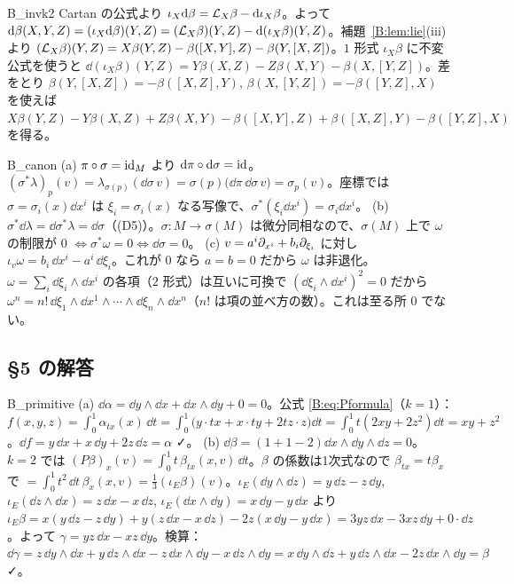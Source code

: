 \begin{soll}{B_invk2}
Cartan の公式より $\iota_X\mathrm{d}\beta=\mathcal L_X\beta-\mathrm{d}\iota_X\beta$。よって $\mathrm{d}\beta(X,Y,Z)=(\iota_X\mathrm{d}\beta)(Y,Z)=(\mathcal L_X\beta)(Y,Z)-\mathrm{d}(\iota_X\beta)(Y,Z)$。補題~\ref{B:lem:lie}(iii) より $(\mathcal L_X\beta)(Y,Z)=X\beta(Y,Z)-\beta([X,Y],Z)-\beta(Y,[X,Z])$。$1$ 形式 $\iota_X\beta$ に不変公式を使うと $\dd(\iota_X\beta)(Y,Z)=Y\beta(X,Z)-Z\beta(X,Y)-\beta(X,[Y,Z])$。差をとり $\beta(Y,[X,Z])=-\beta([X,Z],Y)$, $\beta(X,[Y,Z])=-\beta([Y,Z],X)$ を使えば
$X\beta(Y,Z)-Y\beta(X,Z)+Z\beta(X,Y)-\beta([X,Y],Z)+\beta([X,Z],Y)-\beta([Y,Z],X)$ を得る。
\end{soll}

\begin{soll}{B_canon}
(a) $\pi\circ\sigma=\mathrm{id}_M$ より $\mathrm{d}\pi\circ\mathrm{d}\sigma=\mathrm{id}$。$(\sigma^*\lambda)_p(v)=\lambda_{\sigma(p)}(\dd\sigma\,v)=\sigma(p)\bigl(\dd\pi\,\dd\sigma\,v\bigr)=\sigma_p(v)$。座標では $\sigma=\sigma_i(x)\dd x^i$ は $\xi_i=\sigma_i(x)$ なる写像で、$\sigma^*(\xi_i\dd x^i)=\sigma_i\dd x^i$。
(b) $\sigma^*\dd\lambda=\dd\sigma^*\lambda=\dd\sigma$（(D5)）。$\sigma:M\to\sigma(M)$ は微分同相なので、$\sigma(M)$ 上で $\omega$ の制限が $0$ $\iff\sigma^*\omega=0\iff\dd\sigma=0$。
(c) $v=a^i\partial_{x^i}+b_i\partial_{\xi_i}$ に対し $\iota_v\omega=b_i\,\dd x^i-a^i\,\dd\xi_i$。これが $0$ なら $a=b=0$ だから $\omega$ は非退化。$\omega=\sum_i\dd\xi_i\wedge\dd x^i$ の各項（$2$ 形式）は互いに可換で $(\dd\xi_i\wedge\dd x^i)^2=0$ だから $\omega^n=n!\,\dd\xi_1\wedge\dd x^1\wedge\cdots\wedge\dd\xi_n\wedge\dd x^n$（$n!$ は項の並べ方の数）。これは至る所 $0$ でない。
\end{soll}

\subsection*{§5 の解答}
\begin{soll}{B_primitive}
(a) $\dd\alpha=\dd y\wedge\dd x+\dd x\wedge\dd y+0=0$。公式 \eqref{B:eq:Pformula}（$k=1$）：$f(x,y,z)=\int_0^1\alpha_{tx}(x)\,\dd t=\int_0^1\bigl(y\cdot tx+x\cdot ty+2tz\cdot z\bigr)\dd t=\int_0^1t(2xy+2z^2)\dd t=xy+z^2$。$\dd f=y\,\dd x+x\,\dd y+2z\,\dd z=\alpha$ ✓。
(b) $\dd\beta=(1+1-2)\dd x\wedge\dd y\wedge\dd z=0$。$k=2$ では $(P\beta)_x(v)=\int_0^1t\,\beta_{tx}(x,v)\,\dd t$。$\beta$ の係数は1次式なので $\beta_{tx}=t\beta_x$ で $=\int_0^1t^2\,\dd t\,\beta_x(x,v)=\frac13(\iota_E\beta)(v)$。$\iota_E(\dd y\wedge\dd z)=y\,\dd z-z\,\dd y$, $\iota_E(\dd z\wedge\dd x)=z\,\dd x-x\,\dd z$, $\iota_E(\dd x\wedge\dd y)=x\,\dd y-y\,\dd x$ より
$\iota_E\beta=x(y\,\dd z-z\,\dd y)+y(z\,\dd x-x\,\dd z)-2z(x\,\dd y-y\,\dd x)=3yz\,\dd x-3xz\,\dd y+0\cdot\dd z$。よって $\gamma=yz\,\dd x-xz\,\dd y$。検算：$\dd\gamma=z\,\dd y\wedge\dd x+y\,\dd z\wedge\dd x-z\,\dd x\wedge\dd y-x\,\dd z\wedge\dd y=x\,\dd y\wedge\dd z+y\,\dd z\wedge\dd x-2z\,\dd x\wedge\dd y=\beta$ ✓。
\end{soll}

